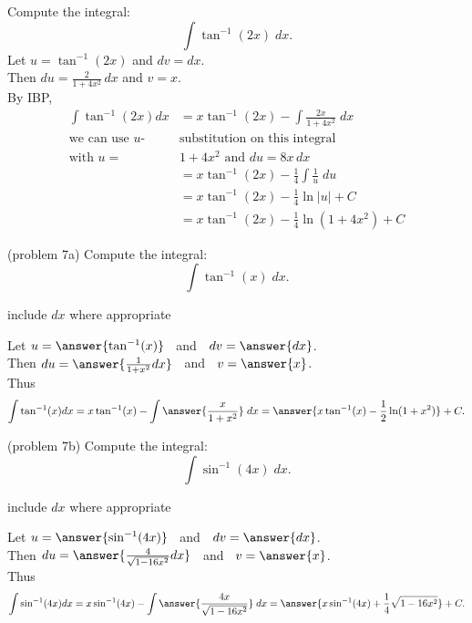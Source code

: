 \documentclass{ximera}
\begin{document}
\begin{example}[example 7]
Compute the integral:
  \[
  \int \tan^{-1}(2x) \;dx.
  \]
Let $u = \tan^{-1}(2x)$   and   $dv = dx$.\\
  Then $du = \frac{2}{1+4x^2}\, dx$   and   $v = x$.\\
By IBP,
  \begin{align*}
  \int  \tan^{-1}(2x) dx &= x\tan^{-1}(2x) - \int \frac{2x}{1+4x^2} \;dx\\
  \text{we can use $u$-} & \text{substitution on this integral} \\
  \text{with $u =$} &  1+4x^2 \text{ and } du = 8x \, dx \\
  &= x\tan^{-1}(2x) - \frac14 \int \frac{1}{u} \; du\\
  &= x\tan^{-1}(2x) - \frac14 \ln|u| + C\\
  &= x\tan^{-1}(2x) - \frac14 \ln(1+4x^2) + C
  \end{align*}
  
\end{example}

\begin{problem}(problem 7a)
Compute the integral:
  \[
  \int \tan^{-1}(x) \;dx.
  \]
\begin{hint}
      include $dx$ where appropriate
  \end{hint}
  Let $u = \answer{\tan^{-1}(x)}\;\;$   and   $\;\;dv = \answer{dx}$.\\
  Then $du = \answer{\frac{1}{1+x^2} dx}\;\;$   and   $\;\;v = \answer{x}$.\\
  Thus 
  \[
  \int \tan^{-1}(x) dx = x\tan^{-1}(x) - \int \answer{\frac{x}{1+x^2}} \;dx = \answer{x\tan^{-1}(x) -\frac12 \ln(1+x^2)} + C.
  \]
\end{problem}

\begin{problem}(problem 7b)
Compute the integral:
  \[
  \int \sin^{-1}(4x) \;dx.
  \]
\begin{hint}
      include $dx$ where appropriate
  \end{hint}
  Let $u = \answer{\sin^{-1}(4x)}\;\;$   and   $\;\;dv = \answer{dx}$.\\
  Then $du = \answer{\frac{4}{\sqrt{1-16x^2}} dx}\;\;$   and   $\;\;v = \answer{x}$.\\
  Thus 
  \[
  \int \sin^{-1}(4x) dx = x\sin^{-1}(4x) - \int \answer{\frac{4x}{\sqrt{1-16x^2}}} \;dx = \answer{x\sin^{-1}(4x) +\frac14 \sqrt{1-16x^2}} + C.
  \]
\end{problem}
\end{document}

